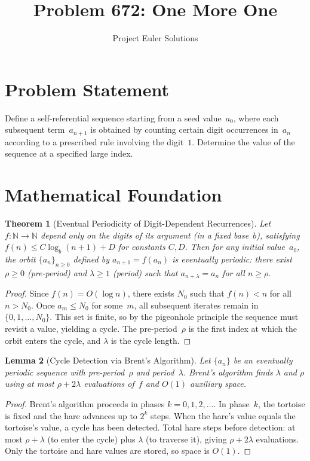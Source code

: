 \documentclass[11pt]{article}
\title{Problem 672: One More One}
\author{Project Euler Solutions}
\date{}
\newtheorem{theorem}{Theorem}
\newtheorem{lemma}[theorem]{Lemma}
\begin{document}
\maketitle

\section{Problem Statement}

Define a self-referential sequence starting from a seed value~$a_0$, where each subsequent term~$a_{n+1}$ is obtained by counting certain digit occurrences in~$a_n$ according to a prescribed rule involving the digit~$1$. Determine the value of the sequence at a specified large index.

\section{Mathematical Foundation}

\begin{theorem}[Eventual Periodicity of Digit-Dependent Recurrences]
Let $f\colon \mathbb{N} \to \mathbb{N}$ depend only on the digits of its argument (in a fixed base~$b$), satisfying $f(n) \le C \log_b(n+1) + D$ for constants $C, D$. Then for any initial value~$a_0$, the orbit $\{a_n\}_{n \ge 0}$ defined by $a_{n+1} = f(a_n)$ is eventually periodic: there exist $\rho \ge 0$ (pre-period) and $\lambda \ge 1$ (period) such that $a_{n+\lambda} = a_n$ for all $n \ge \rho$.
\end{theorem}

\begin{proof}
Since $f(n) = O(\log n)$, there exists $N_0$ such that $f(n) < n$ for all $n > N_0$. Once $a_m \le N_0$ for some~$m$, all subsequent iterates remain in $\{0, 1, \ldots, N_0\}$. This set is finite, so by the pigeonhole principle the sequence must revisit a value, yielding a cycle. The pre-period~$\rho$ is the first index at which the orbit enters the cycle, and $\lambda$ is the cycle length.
\end{proof}

\begin{lemma}[Cycle Detection via Brent's Algorithm]
Let $\{a_n\}$ be an eventually periodic sequence with pre-period~$\rho$ and period~$\lambda$. Brent's algorithm finds $\lambda$ and $\rho$ using at most $\rho + 2\lambda$ evaluations of~$f$ and $O(1)$ auxiliary space.
\end{lemma}

\begin{proof}
Brent's algorithm proceeds in phases $k = 0, 1, 2, \ldots$. In phase~$k$, the tortoise is fixed and the hare advances up to $2^k$ steps. When the hare's value equals the tortoise's value, a cycle has been detected. Total hare steps before detection: at most $\rho + \lambda$ (to enter the cycle) plus $\lambda$ (to traverse it), giving $\rho + 2\lambda$ evaluations. Only the tortoise and hare values are stored, so space is $O(1)$.
\end{proof}
\end{document}

